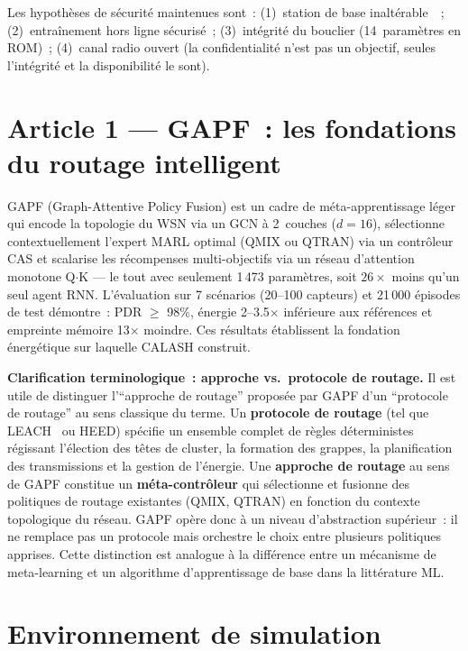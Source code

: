 Les hypothèses de sécurité maintenues sont~: (1)~station de base inaltérable~\cite{heinzelman2000leach}~; (2)~entraînement hors ligne sécurisé~; (3)~intégrité du bouclier (14~paramètres en ROM)~; (4)~canal radio ouvert (la confidentialité n'est pas un objectif, seules l'intégrité et la disponibilité le sont).


\section{Article 1 --- GAPF~: les fondations du routage intelligent}\label{sec:demarche-art1}

GAPF (Graph-Attentive Policy Fusion) est un cadre de méta-apprentissage léger qui encode la topologie du WSN via un GCN à 2~couches ($d = 16$), sélectionne contextuellement l'expert MARL optimal (QMIX ou QTRAN) via un contrôleur CAS et scalarise les récompenses multi-objectifs via un réseau d'attention monotone Q$\cdot$K --- le tout avec seulement 1\,473 paramètres, soit $26\times$ moins qu'un seul agent RNN. L'évaluation sur 7 scénarios (20--100 capteurs) et 21\,000 épisodes de test démontre~: PDR $\geq$ 98\%, énergie 2--3.5$\times$ inférieure aux références et empreinte mémoire 13$\times$ moindre. Ces résultats établissent la fondation énergétique sur laquelle CALASH construit.

\textbf{Clarification terminologique~: approche vs.\ protocole de routage.}
Il est utile de distinguer l'``approche de routage'' proposée par GAPF d'un ``protocole de routage'' au sens classique du terme. Un \textbf{protocole de routage} (tel que LEACH~\cite{heinzelman2000leach} ou HEED) spécifie un ensemble complet de règles déterministes régissant l'élection des têtes de cluster, la formation des grappes, la planification des transmissions et la gestion de l'énergie. Une \textbf{approche de routage} au sens de GAPF constitue un \textbf{méta-contrôleur} qui sélectionne et fusionne des politiques de routage existantes (QMIX, QTRAN) en fonction du contexte topologique du réseau. GAPF opère donc à un niveau d'abstraction supérieur~: il ne remplace pas un protocole mais orchestre le choix entre plusieurs politiques apprises. Cette distinction est analogue à la différence entre un mécanisme de meta-learning et un algorithme d'apprentissage de base dans la littérature ML.


\section{Environnement de simulation}\label{sec:demarche-env}

